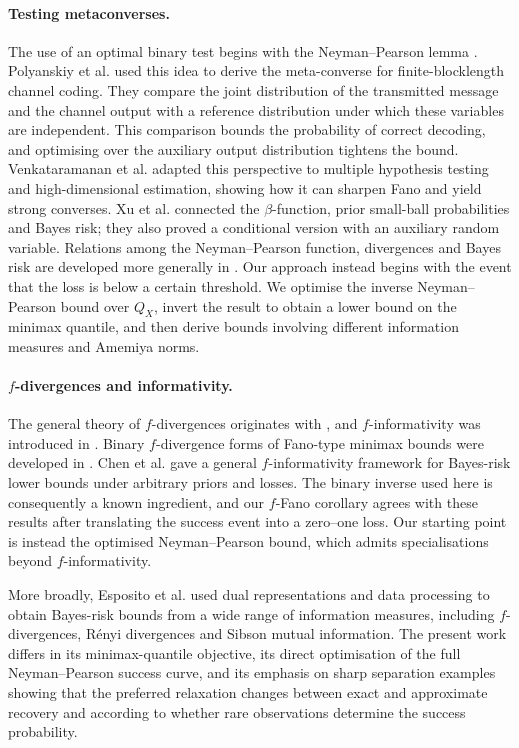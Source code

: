 \documentclass[11pt]{article}
\theoremstyle{definition}
\theoremstyle{remark}
\newcommand{\1}{\boldsymbol{1}}
\begin{document}
\paragraph{Testing metaconverses.}
The use of an optimal binary test begins with the
Neyman--Pearson lemma \cite{NeymanPearson1933}. Polyanskiy et al.
\cite{PolyanskiyPoorVerdu2010} used this idea to derive the meta-converse
for finite-blocklength channel coding. They compare the joint distribution
of the transmitted message and the channel output with a reference
distribution under which these variables are independent. This comparison
bounds the probability of correct decoding, and optimising over the
auxiliary output distribution tightens the bound.
Venkataramanan et al.
\cite{VenkataramananJohnson2018} adapted this perspective to multiple
hypothesis testing and high-dimensional estimation, showing how it can
sharpen Fano and yield strong converses. Xu et al.
\cite{XuRaginsky2017} connected the \(\beta\)-function, prior small-ball
probabilities and Bayes risk; they also proved a conditional version with
an auxiliary random variable. Relations among the Neyman--Pearson function,
divergences and Bayes risk are developed more generally
in \cite{ReidWilliamson2011}. Our approach instead begins with the event
that the loss is below a certain threshold. We optimise the inverse
Neyman--Pearson bound over \(Q_X\), invert the result to obtain a lower
bound on the minimax quantile, and then derive bounds involving different
information measures and Amemiya norms.

\paragraph{\(f\)-divergences and informativity.}
The general theory of \(f\)-divergences originates with
\cite{AliSilvey1966,Csiszar1967}, and \(f\)-informativity was introduced
in \cite{Csiszar1972}. Binary \(f\)-divergence forms of Fano-type minimax
bounds were developed in \cite{Gushchin2003,Guntuboyina2011}. Chen et al.
\cite{ChenGuntuboyinaZhang2016} gave a general \(f\)-informativity
framework for Bayes-risk lower bounds under arbitrary priors and losses.
The binary inverse used here is consequently a known ingredient, and our
\(f\)-Fano corollary agrees with these results after translating the
success event into a zero--one loss. Our starting point is instead the
optimised Neyman--Pearson bound, which admits specialisations beyond
\(f\)-informativity.

More broadly, Esposito et al.
\cite{EspositoVandenbroucqueGastpar2024} used dual representations and
data processing to obtain Bayes-risk bounds from a wide range of
information measures, including \(f\)-divergences, R\'enyi divergences
and Sibson mutual information. The present work differs in its
minimax-quantile objective, its direct optimisation of the full
Neyman--Pearson success curve, and its emphasis on sharp separation
examples showing that the preferred relaxation changes between exact and
approximate recovery and according to whether rare observations determine
the success probability.
\end{document}
